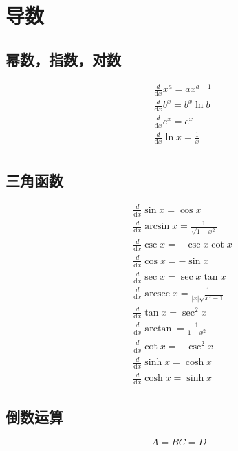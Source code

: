 \section{导数}

\subsection{幂数，指数，对数}
\begin{align}
&\frac{d}{\mathrm{d}{x}}x^a = ax^{a-1} \\
&\frac{d}{\mathrm{d}{x}}b^x = b^x\ln b \\
&\frac{d}{\mathrm{d}{x}}e^x = e^x \\
&\frac{d}{\mathrm{d}{x}} \ln{x} = \frac{1}{x} \\
\end{align}

\subsection{三角函数}
\begin{align}
&\frac{d}{\mathrm{d}{x}}\sin x = \cos x \\
&\frac{d}{\mathrm{d}{x}}\arcsin x = \frac{1}{\sqrt{1-x^2}} \\
&\frac{d}{\mathrm{d}{x}}\csc x = -\csc x\cot x \\
&\frac{d}{\mathrm{d}{x}}\cos x = -\sin x \\
&\frac{d}{\mathrm{d}{x}}\sec x = \sec x\tan x \\
&\frac{d}{\mathrm{d}{x}}\operatorname{arcsec}{x}=\frac{1}{\left|x\right|\sqrt{x^2-1}}\\
&\frac{d}{\mathrm{d}{x}}\tan x = \sec^2x \\
&\frac{d}{\mathrm{d}{x}}\arctan = \frac{1}{1+x^2} \\
&\frac{d}{\mathrm{d}{x}}\cot x = -\csc^2x \\
&\frac{d}{\mathrm{d}{x}}\sinh x = \cosh x \\
&\frac{d}{\mathrm{d}{x}}\cosh x = \sinh x
\end{align}


\subsection{倒数运算}

\newenvironment{mysubequations}
{ \begin{subequations}
  \renewcommand {\theequation}{\theparentequation-\arabic{equation}}}
{\end{subequations}}

\begin{mysubequations}
\begin{equation}
A = B
\end{equation}
\begin{equation}
C = D
\end{equation}
\end{mysubequations}

